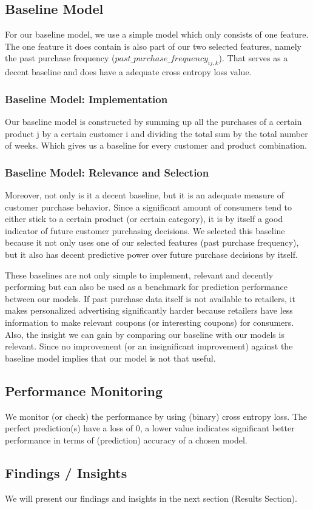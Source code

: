 \subsection{Baseline Model}
For our baseline model, we use a simple model which only consists of one
feature. The one feature it does contain is also part of our two selected
features, namely the past purchase frequency
($past\_purchase\_frequency_{ij,k}$). That serves as a decent baseline and does
have a adequate cross entropy loss value.

\subsubsection{Baseline Model: Implementation}
Our baseline model is constructed by summing up all the purchases of a certain
product j by a certain customer i and dividing the total sum by the total number
of weeks. Which gives us a baseline for every customer and product combination.

\subsubsection{Baseline Model: Relevance and Selection}
Moreover, not only is it a decent baseline, but it is an adequate measure of
customer purchase behavior. Since a significant amount of consumers tend to
either stick to a certain product (or certain category), it is by itself a good
indicator of future customer purchasing decisions. We selected this baseline
because it not only uses one of our selected features (past purchase frequency),
but it also has decent predictive power over future purchase decisions by
itself.

These baselines are not only simple to implement, relevant and decently
performing but can also be used as a benchmark for prediction performance between
our models. If past purchase data itself is not available to retailers, it makes
personalized advertising significantly harder because retailers have less
information to make relevant coupons (or interesting coupons) for consumers.
Also, the insight we can gain by comparing our baseline with our models is
relevant. Since no improvement (or an insignificant improvement) against the
baseline model implies that our model is not that useful.

\subsection{Performance Monitoring}
We monitor (or check) the performance by using (binary) cross entropy loss. The
perfect prediction(s) have a loss of 0, a lower value indicates significant
better performance in terms of (prediction) accuracy of a chosen model.

\subsection{Findings / Insights}
We will present our findings and insights in the next section (Results Section).
